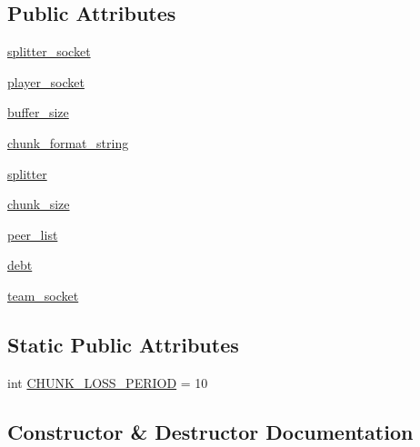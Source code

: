 \subsection*{Public Attributes}
\begin{DoxyCompactItemize}
\item 
\hyperlink{classsrc_1_1core_1_1lossy__peer_1_1Lossy__Peer_a087e9cd5f4cff34cf27e0ba681f07594}{splitter\+\_\+socket}
\item 
\hyperlink{classsrc_1_1core_1_1lossy__peer_1_1Lossy__Peer_a7bfd270bb2703665038fbf34a336db9a}{player\+\_\+socket}
\item 
\hyperlink{classsrc_1_1core_1_1lossy__peer_1_1Lossy__Peer_a1c4fe5e082d243fff4682739b1c48a76}{buffer\+\_\+size}
\item 
\hyperlink{classsrc_1_1core_1_1lossy__peer_1_1Lossy__Peer_aecdff86c33a4d0ccd46ab3170fa6e1ac}{chunk\+\_\+format\+\_\+string}
\item 
\hyperlink{classsrc_1_1core_1_1lossy__peer_1_1Lossy__Peer_a850ba6d9b1c9b3530f319a2ad70fe9f8}{splitter}
\item 
\hyperlink{classsrc_1_1core_1_1lossy__peer_1_1Lossy__Peer_a4ab6dc894a7ddc47a169b7e442ac5ddd}{chunk\+\_\+size}
\item 
\hyperlink{classsrc_1_1core_1_1lossy__peer_1_1Lossy__Peer_a784a113a40b7e2a5babd59c3330dd274}{peer\+\_\+list}
\item 
\hyperlink{classsrc_1_1core_1_1lossy__peer_1_1Lossy__Peer_adbe5a798549dfaa38eb81d1313b1216d}{debt}
\item 
\hyperlink{classsrc_1_1core_1_1lossy__peer_1_1Lossy__Peer_a3f17b1d5038ff538511b5197d6c8a22e}{team\+\_\+socket}
\end{DoxyCompactItemize}
\subsection*{Static Public Attributes}
\begin{DoxyCompactItemize}
\item 
int \hyperlink{classsrc_1_1core_1_1lossy__peer_1_1Lossy__Peer_a3afd1306f120723269df31abdcda8c56}{C\+H\+U\+N\+K\+\_\+\+L\+O\+S\+S\+\_\+\+P\+E\+R\+I\+O\+D} = 10
\end{DoxyCompactItemize}


\subsection{Constructor \& Destructor Documentation}
\hypertarget{classsrc_1_1core_1_1lossy__peer_1_1Lossy__Peer_a3adafb293fe4d7a80955a1ee979d1ac7}{}
